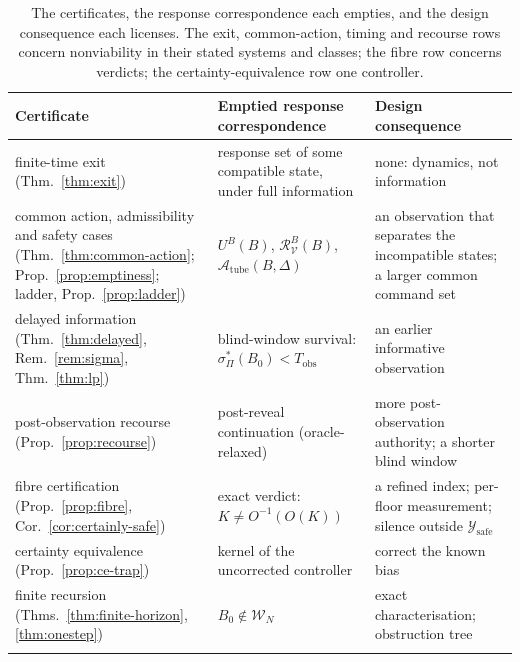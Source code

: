 \documentclass[11pt,a4paper]{article}
\theoremstyle{plain}
\theoremstyle{definition}
\theoremstyle{remark}
\newcommand{\cV}{\mathcal{V}}
\newcommand{\cR}{\mathcal{R}}
\newcommand{\cA}{\mathcal{A}}
\newcommand{\cW}{\mathcal{W}}
\newcommand{\cY}{\mathcal{Y}}
\newcommand{\Tobs}{T_{\mathrm{obs}}}
\newcommand{\Atube}{\cA_{\mathrm{tube}}}
\begin{document}
\begin{table}[tb]
\centering\small\renewcommand{\arraystretch}{1.1}
\begin{tabularx}{\textwidth}{@{}>{\raggedright\arraybackslash}p{}>{\raggedright\arraybackslash}p{}X@{}}
\toprule
Certificate & Emptied response correspondence & Design consequence\\
\midrule
finite-time exit (Thm.~\ref{thm:exit}) & response set of some compatible state, under full information & none: dynamics, not information\\\addlinespace[3pt]
common action, admissibility and safety cases (Thm.~\ref{thm:common-action}; Prop.~\ref{prop:emptiness}; ladder, Prop.~\ref{prop:ladder}) & $U^B(B)$, $\cR^B_\cV(B)$, $\Atube(B,\Delta)$ & an observation that separates the incompatible states; a larger common command set\\\addlinespace[3pt]
delayed information (Thm.~\ref{thm:delayed}, Rem.~\ref{rem:sigma}, Thm.~\ref{thm:lp}) & blind-window survival: $\sigma^*_\Pi(B_0)<\Tobs$ & an earlier informative observation\\\addlinespace[3pt]
post-observation recourse (Prop.~\ref{prop:recourse}) & post-reveal continuation (oracle-relaxed) & more post-observation authority; a shorter blind window\\\addlinespace[3pt]
fibre certification (Prop.~\ref{prop:fibre}, Cor.~\ref{cor:certainly-safe}) & exact verdict: $K\ne O^{-1}(O(K))$ & a refined index; per-floor measurement; silence outside $\cY_{\mathrm{safe}}$\\\addlinespace[3pt]
certainty equivalence (Prop.~\ref{prop:ce-trap}) & kernel of the uncorrected controller & correct the known bias\\\addlinespace[3pt]
finite recursion (Thms.~\ref{thm:finite-horizon}, \ref{thm:onestep}) & $B_0\notin\cW_N$ & exact characterisation; obstruction tree\\\addlinespace[3pt]
\bottomrule
\end{tabularx}
\caption{The certificates, the response correspondence each empties, and the design consequence each licenses. The exit, common-action, timing and recourse rows concern nonviability in their stated systems and classes; the fibre row concerns verdicts; the certainty-equivalence row one controller.}
\label{tab:summary}
\end{table}
\end{document}
